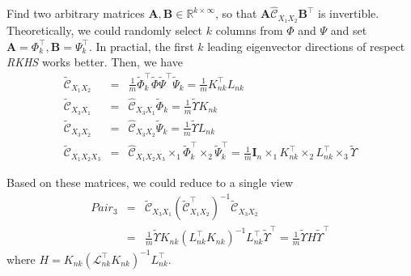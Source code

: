 \documentclass{article}
\begin{document}
Find two arbitrary matrices $\bm{A,B}\in \mathbb{R}^{k \times \infty}$, so that $\bm{A}\widehat{\mathcal{C}}_{X_1X_2}\bm{B}^\top$ is invertible. Theoretically, we could randomly select $k$ columns from $\Phi$ and $\Psi$ and set $\bm{A} = \Phi_k^\top, \bm{B} = \Psi_k^\top$. In practial, the first $k$ leading eigenvector directions of respect \emph{RKHS} works better.
%
Then, we have
%
\begin{eqnarray*}
\widetilde{\mathcal{C}}_{X_1 X_2} &=& \frac{1}{m}\widetilde \Phi_k^\top \widetilde\Phi\widetilde\Psi^\top\widetilde\Psi_k = \frac{1}{m}{K}_{nk}^\top{L}_{nk}\\
\widetilde{\mathcal{C}}_{X_3 X_1} &=& \widehat{\mathcal{C}}_{X_3X_1}\widetilde\Phi_k = \frac{1}{m}\widetilde\Upsilon{K}_{nk}\\
\widetilde{\mathcal{C}}_{X_3 X_2} &=& \widehat{\mathcal{C}}_{X_3X_2}\widetilde\Psi_k = \frac{1}{m}\widetilde\Upsilon{L}_{nk}\\
\widetilde{\mathcal{C}}_{X_1 X_2 X_3} &=&
\widehat{\mathcal{C}}_{X_1 X_2 X_3}\times_1\widetilde\Phi_k^\top
\times_2\widetilde\Psi_k^\top = \frac{1}{m} \bm{I}_n \times_1
{K}_{nk}^\top \times_2 {L}_{nk}^\top \times_3
\widetilde\Upsilon
\end{eqnarray*}
%

Based on these matrices, we could reduce to a single view
%
\begin{eqnarray*}
Pair_3 &=&
\widetilde{\mathcal{C}}_{X_3X_1}(\widetilde{\mathcal{C}}_{X_1X_2}^\top)^{-1}\widetilde{\mathcal{C}}_{X_3X_2}\\
&=&\frac{1}{m}\widetilde\Upsilon{K}_{nk}({L}_{nk}^\top{K}_{nk})^{-1}{L}_{nk}^\top\widetilde\Upsilon^\top = \frac{1}{m}\widetilde\Upsilon{H}\widetilde\Upsilon^\top
\end{eqnarray*}
where ${H} = {K}_{nk}(\mathcal{L}_{nk}^\top{K}_{nk})^{-1}{L}_{nk}^\top$.
\end{document}
